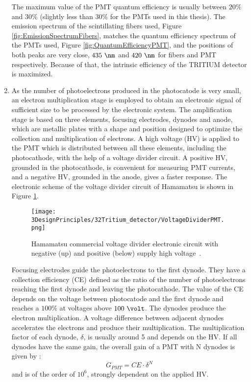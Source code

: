 \begin{enumerate}
The maximum value of the PMT quantum efficiency is usually between $20\%$ and $30\%$ \cite{Knoll} (slightly less than $30\%$ for the PMTs used in this thesis). The emission spectrum of the scintillating fibers used, Figure \ref{fig:EmissionSpectrumFibers}, matches the quantum efficiency spectrum of the PMTs used, Figure \ref{fig:QuantumEfficiencyPMT}, and the positions of both peaks are very close, $435~\nm$ and $420~\nm$ for fibers and PMT respectively. Because of that, the intrinsic efficiency of the TRITIUM detector is maximized.

\item{} As the number of photoelectrons produced in the photocatode is very small, an electron multiplication stage is employed to obtain an electronic signal of sufficient size to be processed by the electronic system. The amplification stage is based on three elements, focusing electrodes, dynodes and anode, which are metallic plates with a shape and position designed to optimize the collection and multiplication of electrons. A high voltage (HV) is applied to the PMT which is distributed between all these elements, including the photocathode, with the help of a voltage divider circuit. A positive HV, grounded in the photocathode, is convenient for measuring PMT currents, and a negative HV, grounded in the anode, gives a faster response. The electronic scheme of the voltage divider circuit of Hamamatsu is shown in Figure \ref{fig:VoltageDividerCircuit}.

\begin{figure}[h]
\centering
\texttt{[image: 3DesignPrinciples/32Tritium\_detector/VoltageDividerPMT.png]}
\caption{Hamamatsu commercial voltage divider electronic circuit with negative (up) and positive (below) supply high voltage\label{fig:VoltageDividerCircuit}~\cite{DataSheetPMTs}.}
\end{figure}


Focusing electrodes guide the photoelectrons to the first dynode. They have a collection efficiency (CE) defined as the ratio of the number of photoelectrons reaching the first dynode and leaving the photocathode. The value of the CE depends on the voltage between photocatode and the first dynode and reaches a $100\%$ at voltages above $100~\volt$. The dynodes produce the electron multiplication. A voltage difference between adjacent dynodes accelerates the electrons and produce their multiplication. The multiplication factor of each dynode, $\delta$, is usually around 5 and depends on the HV. If all dynodes have the same gain, the overall gain of a PMT with N dynodes is given by \cite{Knoll}:
\begin{equation}
G_{PMT} = CE\cdot{} \delta^N
\label{eq:PMTGain}
\end{equation}
and is of the order of $10^6$, strongly dependent on the applied HV.


\end{enumerate}
